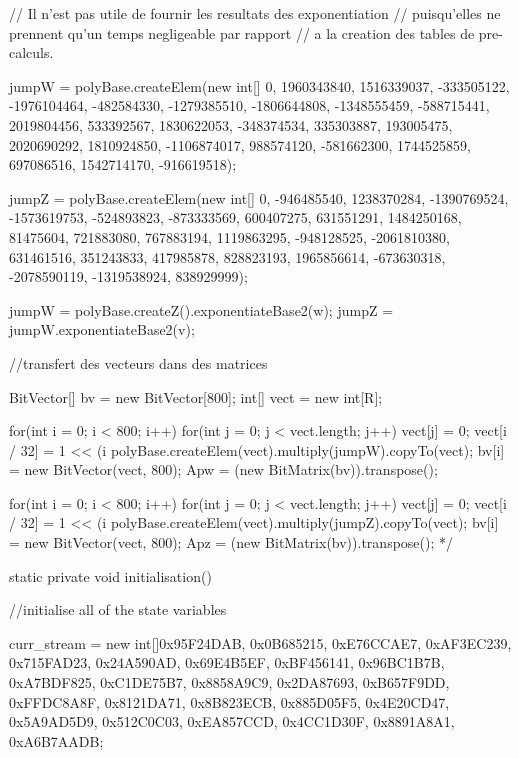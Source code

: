 \begin{code}
\begin{hide}
{{      // Il n'est pas utile de fournir les resultats des exponentiation
      // puisqu'elles ne prennent qu'un temps negligeable par rapport
      // a la creation des tables de pre-calculs.


      jumpW = polyBase.createElem(new int[]
         {0, 1960343840, 1516339037, -333505122, -1976104464, -482584330,
          -1279385510, -1806644808, -1348555459, -588715441, 2019804456,
          533392567, 1830622053, -348374534, 335303887, 193005475, 2020690292,
          1810924850, -1106874017, 988574120, -581662300, 1744525859,
          697086516, 1542714170, -916619518});

      jumpZ = polyBase.createElem(new int[]
         {0, -946485540, 1238370284, -1390769524, -1573619753, -524893823,
          -873333569, 600407275, 631551291, 1484250168, 81475604, 721883080,
          767883194, 1119863295, -948128525, -2061810380, 631461516,
          351243833, 417985878, 828823193, 1965856614, -673630318,
          -2078590119, -1319538924, 838929999});


      jumpW = polyBase.createZ().exponentiateBase2(w);
      jumpZ = jumpW.exponentiateBase2(v);



      //transfert des vecteurs dans des matrices

      BitVector[] bv = new BitVector[800];
      int[] vect = new int[R];

      for(int i = 0; i < 800; i++)
         {
            for(int j = 0; j < vect.length; j++)
               vect[j] = 0;
            vect[i / 32] = 1 << (i %
            polyBase.createElem(vect).multiply(jumpW).copyTo(vect);
            bv[i] = new BitVector(vect, 800);
         }
      Apw = (new BitMatrix(bv)).transpose();


      for(int i = 0; i < 800; i++)
         {
            for(int j = 0; j < vect.length; j++)
               vect[j] = 0;
            vect[i / 32] = 1 << (i %
            polyBase.createElem(vect).multiply(jumpZ).copyTo(vect);
            bv[i] = new BitVector(vect, 800);
         }
      Apz = (new BitMatrix(bv)).transpose();
      */
   }



   static private void initialisation() {
      //initialise all of the state variables

      curr_stream = new int[]{0x95F24DAB, 0x0B685215, 0xE76CCAE7, 0xAF3EC239,
                              0x715FAD23, 0x24A590AD, 0x69E4B5EF, 0xBF456141,
                              0x96BC1B7B, 0xA7BDF825, 0xC1DE75B7, 0x8858A9C9,
                              0x2DA87693, 0xB657F9DD, 0xFFDC8A8F, 0x8121DA71,
                              0x8B823ECB, 0x885D05F5, 0x4E20CD47, 0x5A9AD5D9,
                              0x512C0C03, 0xEA857CCD, 0x4CC1D30F, 0x8891A8A1,
                              0xA6B7AADB};

}}
\end{hide}
\end{code}
